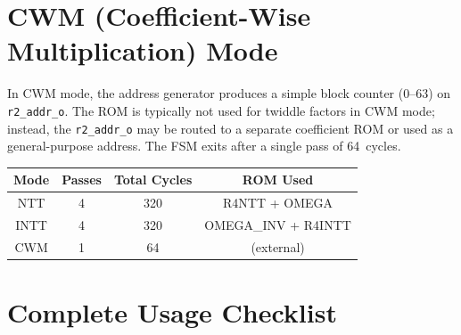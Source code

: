 \documentclass[11pt,a4paper]{article}
\newcommand{\port}[1]{\texttt{#1}}
\begin{document}
\section{CWM (Coefficient-Wise Multiplication) Mode}
\label{sec:cwm}

In CWM mode, the address generator produces a simple block counter (0--63) on \port{r2\_addr\_o}. The ROM is typically not used for twiddle factors in CWM mode; instead, the \port{r2\_addr\_o} may be routed to a separate coefficient ROM or used as a general-purpose address. The FSM exits after a single pass of 64~cycles.

\begin{center}
\begin{tabular}{cccc}
\toprule
\textbf{Mode} & \textbf{Passes} & \textbf{Total Cycles} & \textbf{ROM Used} \\
\midrule
NTT  & 4 & 320 & R4NTT + OMEGA \\
INTT & 4 & 320 & OMEGA\_INV + R4INTT \\
CWM  & 1 & 64  & (external) \\
\bottomrule
\end{tabular}
\end{center}

\section{Complete Usage Checklist}
\label{sec:checklist}
\end{document}
